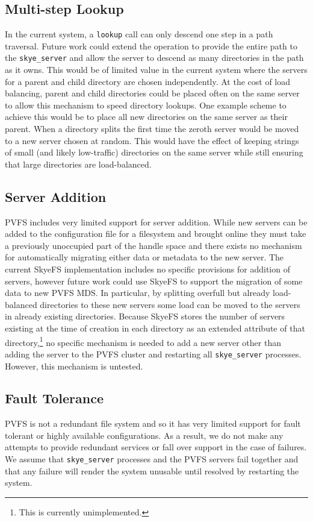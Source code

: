 \documentclass[twocolumn,letterpaper]{article}
\newcommand{\code}[1]{\texttt{#1}}
\begin{document}
\subsection{Multi-step Lookup}
In the current system, a \code{lookup} call can only descend one step in a path
traversal.  Future work could extend the operation to provide the entire path
to the \code{skye\_\-server} and allow the server to descend as many
directories in the path as it owns.  This would be of limited value in the
current system where the servers for a parent and child directory are chosen
independently.  At the cost of load balancing, parent and child directories
could be placed often on the same server to allow this mechanism to speed
directory lookups.  One example scheme to achieve this would be to place all
new directories on the same server as their parent.  When a directory splits
the first time the zeroth server would be moved to a new server chosen at
random.  This would have the effect of keeping strings of small (and likely
low-traffic) directories on the same server while still ensuring that large
directories are load-balanced.

\subsection{Server Addition}
PVFS includes very limited support for server addition.  While new servers can
be added to the configuration file for a filesystem and brought online they must
take a previously unoccupied part of the handle space and there exists no
mechanism for automatically migrating either data or metadata to the new server.
The current SkyeFS implementation includes no specific provisions for addition
of servers, however future work could use SkyeFS to support the migration of
some data to new PVFS MDS.  In particular, by splitting overfull but already
load-balanced directories to these new servers some load can be moved to the
servers in already existing directories.  Because SkyeFS stores the number of
servers existing at the time of creation in each directory as an extended
attribute of that directory,\footnote{This is currently unimplemented.} no
specific mechanism is needed to add a new server other than adding the server
to the PVFS cluster and restarting all \code{skye\_\-server} processes.  However,
this mechanism is untested.

\subsection{Fault Tolerance}
PVFS is not a redundant file system and so it has very limited support for fault
tolerant or highly available configurations.  As a result, we do not make any
attempts to provide redundant services or fall over support in the case of
failures.  We assume that \code{skye\_\-server} processes and the PVFS servers fail
together and that any failure will render the system unusable until resolved by
restarting the system.
\end{document}
